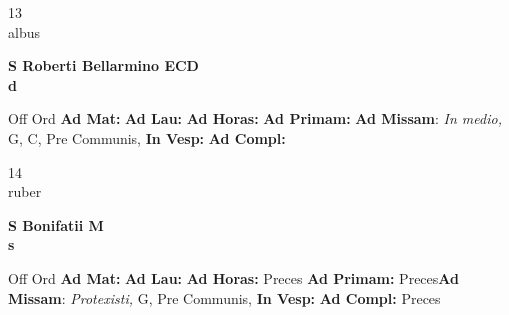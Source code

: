 \documentclass[10pt, openany]{book}
\begin{document}
    \begin{center}
        \begin{minipage}{3.5in}
            \vspace{2em}
            \begin{minipage}{0.5in}
                {\Huge 13} \\
                {\normalsize albus}
            \end{minipage}
            \begin{minipage}{3.0in}
                \textbf{ \large S Roberti Bellarmino ECD \\
                \textnormal{\normalsize d}}

            \end{minipage}
            \begin{justify}Off Ord
                \textbf{Ad Mat: }
                \textbf{Ad Lau: }
                \textbf{Ad Horas: }
                \textbf{Ad Primam: }\textbf{Ad Missam}: \textit{In medio,} G, C, Pre Communis, 
                \textbf{In Vesp: }
                \textbf{Ad Compl: }
            \end{justify}
        \end{minipage}
    \end{center}

    \begin{center}
        \begin{minipage}{3.5in}
            \vspace{2em}
            \begin{minipage}{0.5in}
                {\Huge 14} \\
                {\normalsize ruber}
            \end{minipage}
            \begin{minipage}{3.0in}
                \textbf{ \large S Bonifatii M \\
                \textnormal{\normalsize s}}

            \end{minipage}
            \begin{justify}Off Ord
                \textbf{Ad Mat: }
                \textbf{Ad Lau: }
                \textbf{Ad Horas: }Preces
                \textbf{Ad Primam: }Preces\textbf{Ad Missam}: \textit{Protexisti,} G, Pre Communis, 
                \textbf{In Vesp: }
                \textbf{Ad Compl: }Preces
            \end{justify}
        \end{minipage}
    \end{center}
\end{document}
